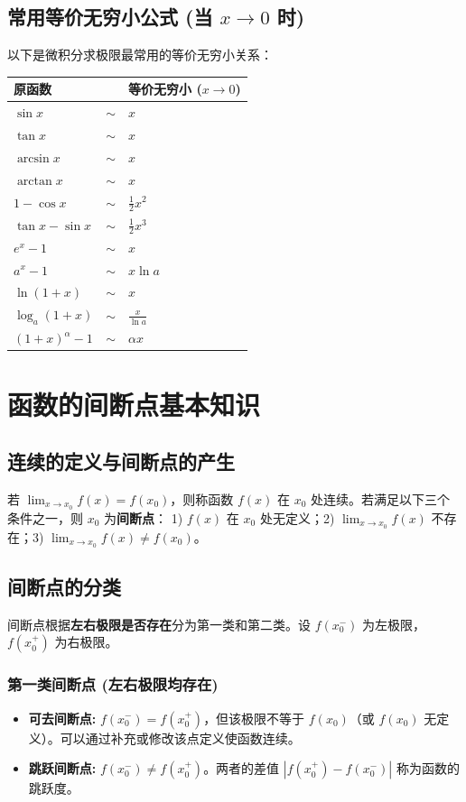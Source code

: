 \documentclass{article}
\begin{document}
\subsection{常用等价无穷小公式 (当 $x \to 0$ 时)}
以下是微积分求极限最常用的等价无穷小关系：
\begin{table}[h]
\centering
\begin{tabular}{lcl}
\toprule
\textbf{原函数} & & \textbf{等价无穷小 ($x \to 0$)} \\
\midrule
$\sin x$ & $\sim$ & $x$ \\
$\tan x$ & $\sim$ & $x$ \\
$\arcsin x$ & $\sim$ & $x$ \\
$\arctan x$ & $\sim$ & $x$ \\
$1 - \cos x$ & $\sim$ & $\frac{1}{2}x^2$ \\
$\tan x - \sin x$ & $\sim$ & $\frac{1}{2}x^3$ \\
$e^x - 1$ & $\sim$ & $x$ \\
$a^x - 1$ & $\sim$ & $x \ln a$ \\
$\ln(1 + x)$ & $\sim$ & $x$ \\
$\log_a(1 + x)$ & $\sim$ & $\frac{x}{\ln a}$ \\
$(1 + x)^\alpha - 1$ & $\sim$ & $\alpha x$ \\
\bottomrule
\end{tabular}
\end{table}

\section{函数的间断点基本知识}

\subsection{连续的定义与间断点的产生}
若 $\lim_{x \to x_0} f(x) = f(x_0)$，则称函数 $f(x)$ 在 $x_0$ 处连续。若满足以下三个条件之一，则 $x_0$ 为\textbf{间断点}：
1) $f(x)$ 在 $x_0$ 处无定义；2) $\lim_{x \to x_0} f(x)$ 不存在；3) $\lim_{x \to x_0} f(x) \neq f(x_0)$。

\subsection{间断点的分类}
间断点根据\textbf{左右极限是否存在}分为第一类和第二类。设 $f(x_0^-)$ 为左极限，$f(x_0^+)$ 为右极限。

\subsubsection{第一类间断点 (左右极限均存在)}
\begin{itemize}[leftmargin=1.5em]
    \item \textbf{可去间断点:} $f(x_0^-) = f(x_0^+)$，但该极限不等于 $f(x_0)$（或 $f(x_0)$ 无定义）。可以通过补充或修改该点定义使函数连续。
    \item \textbf{跳跃间断点:} $f(x_0^-) \neq f(x_0^+)$。两者的差值 $|f(x_0^+) - f(x_0^-)|$ 称为函数的跳跃度。
\end{itemize}
\end{document}
